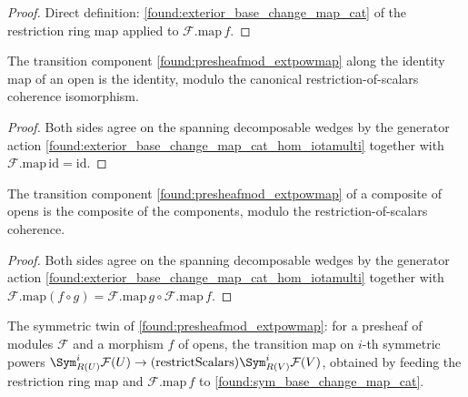 \begin{proof}
  \leanok
  Direct definition: \cref{found:exterior_base_change_map_cat} of the restriction ring
  map applied to \(\mathcal F.\mathrm{map}\,f\).
\end{proof}

\begin{lemma}
  \label{found:presheafmod_extpowmap_id}
  The transition component \cref{found:presheafmod_extpowmap} along the identity map
  of an open is the identity, modulo the canonical restriction-of-scalars coherence
  isomorphism.
\end{lemma}

\begin{proof}
  \leanok
  Both sides agree on the spanning decomposable wedges by the generator action
  \cref{found:exterior_base_change_map_cat_hom_iotamulti} together with
  \(\mathcal F.\mathrm{map}\,\mathrm{id}=\mathrm{id}\).
\end{proof}

\begin{lemma}
  \label{found:presheafmod_extpowmap_comp}
  The transition component \cref{found:presheafmod_extpowmap} of a composite of opens
  is the composite of the components, modulo the restriction-of-scalars coherence.
\end{lemma}

\begin{proof}
  \leanok
  Both sides agree on the spanning decomposable wedges by the generator action
  \cref{found:exterior_base_change_map_cat_hom_iotamulti} together with
  \(\mathcal F.\mathrm{map}(f\circ g)=\mathcal F.\mathrm{map}\,g\circ\mathcal F.\mathrm{map}\,f\).
\end{proof}

\begin{lemma}
  \label{found:presheafmod_sympowmap}
  The symmetric twin of \cref{found:presheafmod_extpowmap}: for a presheaf of modules
  \(\mathcal F\) and a morphism \(f\) of opens, the transition map on \(i\)-th
  symmetric powers
  \(\Sym^i_{R(U)}\mathcal F(U)\to(\mathrm{restrictScalars})\Sym^i_{R(V)}\mathcal F(V)\),
  obtained by feeding the restriction ring map and \(\mathcal F.\mathrm{map}\,f\) to
  \cref{found:sym_base_change_map_cat}.
\end{lemma}

